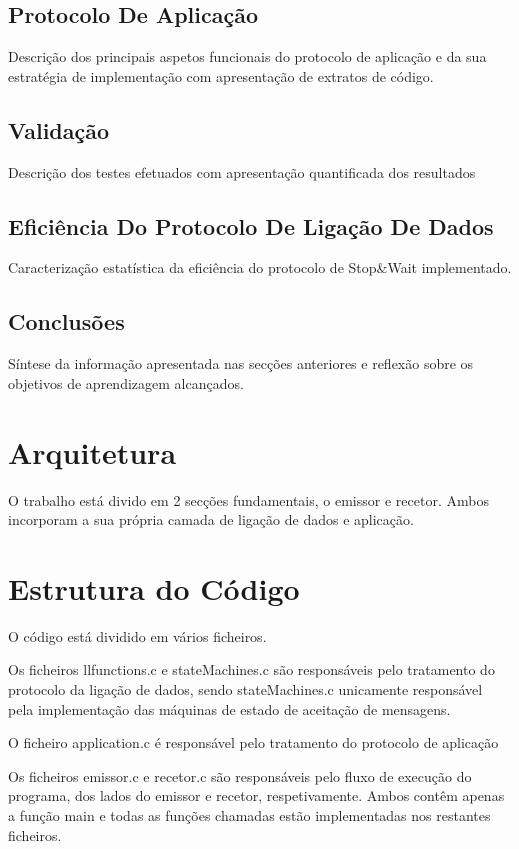 \documentclass{article}
\begin{document}
\subsection{Protocolo De Aplicação}
Descrição dos principais aspetos funcionais do protocolo de aplicação e da sua estratégia de implementação com apresentação de extratos de código.

\subsection{Validação}
Descrição dos testes efetuados com apresentação quantificada dos resultados

\subsection{Eficiência Do Protocolo De Ligação De Dados}
Caracterização estatística da eficiência do protocolo de Stop\&Wait implementado.

\subsection{Conclusões}
Síntese da informação apresentada nas secções anteriores e reflexão sobre os objetivos de aprendizagem alcançados.


\section{Arquitetura}
O trabalho está divido em 2 secções fundamentais, o emissor e recetor. Ambos incorporam a sua própria camada de ligação de dados e aplicação.

\section{Estrutura do Código}
O código está dividido em vários ficheiros.

Os ficheiros llfunctions.c e stateMachines.c são responsáveis pelo tratamento do protocolo da ligação de dados, sendo stateMachines.c unicamente responsável pela implementação das máquinas de estado de aceitação de mensagens.

O ficheiro application.c é responsável pelo tratamento do protocolo de aplicação

Os ficheiros emissor.c e recetor.c são responsáveis pelo fluxo de execução do programa, dos lados do emissor e recetor, respetivamente. Ambos contêm apenas a função main e todas as funções chamadas estão implementadas nos restantes ficheiros.
\end{document}
